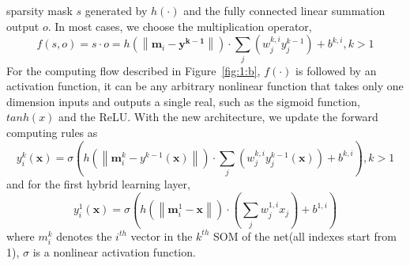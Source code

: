 \documentclass[3p,times,procedia]{elsarticle}
\begin{document}
sparsity mask $s$ generated by $h(\cdot)$ 
and the fully connected linear summation 
output $o$. In most cases, we choose the
multiplication operator,
\begin{equation}
	f(s,o) = s\cdot o = 
	h\left(
	\left\|
	\mathbf{m}_i-\mathbf{y^{k-1}}
	\right\|
	\right)
	\cdot
	\sum_j
	\left(
	w_j^{k,i}y_j^{k-1}
	\right)
	+b^{k,i},k>1
	\label{eq:14}
\end{equation}
For the computing flow described in 
Figure~\ref{fig:1:b}, 
$f(\cdot) $ is followed 
by an activation function, it can be any 
arbitrary nonlinear function that takes 
only one dimension inputs and outputs a 
single real, such as the sigmoid function, 
$tanh(x)$ and the ReLU. With the new 
architecture, we update the forward computing
rules as 
\begin{equation}
	y_i^k(\mathbf{x})=
	\sigma\left(
	h\left(
	\left\|
	\mathbf{m}_i^k-y^{k-1}(\mathbf{x})
	\right\|
	\right)\cdot
	\sum_j\left(
	w_j^{k,i}y_j^{k-1}(\mathbf{x})
	\right) + b^{k,i}
	\right), k>1
	\label{eq:15}
\end{equation}
and for the first hybrid learning layer,  
\begin{equation}
	y_i^1(\mathbf{x})=
	\sigma\left(
	h\left(
	\left\|
	\mathbf{m}_i^1-\mathbf{x}
	\right\|
	\right)\cdot
	\left(
	\sum_j w_j^{1,i}x_j
	\right) + b^{1,i}
	\right)
	\label{eq:16}
\end{equation}
where $m^k_i$ denotes the $i^{th}$ vector
in the $k^{th}$ SOM of the net(all indexes
start from 1), $\sigma$ is a nonlinear 
activation function.
\end{document}
